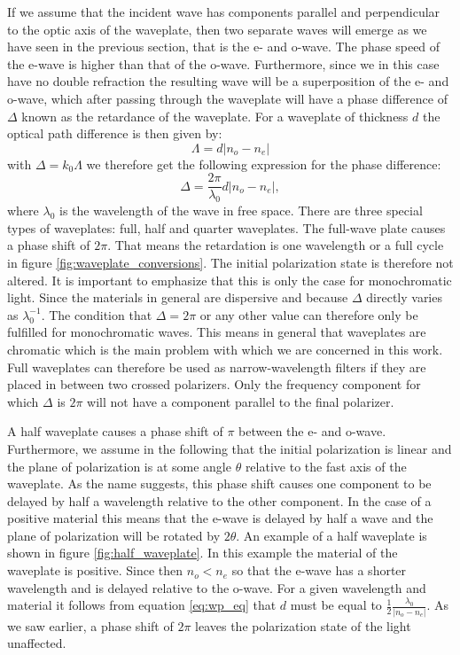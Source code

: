 If we assume that the incident wave has components parallel and perpendicular to the optic axis of the waveplate, then two separate waves will emerge as we have seen in the previous section, that is the e- and o-wave. The phase speed of the e-wave is higher than that of the o-wave. Furthermore, since we in this case have no double refraction the resulting wave will be a superposition of the e- and o-wave, which after passing through the waveplate will have a phase difference of $\Delta$ known as the retardance of the waveplate. For a waveplate of thickness $d$ the optical path difference is then given by:
\begin{equation}
    \Lambda = d|n_o - n_e|
\end{equation}
with $\Delta = k_0 \Lambda$ we therefore get the following expression for the phase difference:
\begin{equation}
    \label{eq:wp_eq}
    \Delta = \frac{2\pi}{\lambda_0}d|n_o - n_e|,
\end{equation}
where $\lambda_0$ is the wavelength of the wave in free space. There are three special types of waveplates: full, half and quarter waveplates. The full-wave plate causes a phase shift of $2\pi$. That means the retardation is one wavelength or a full cycle in figure \ref{fig:waveplate_conversions}. The initial polarization state is therefore not altered. It is important to emphasize that this is only the case for monochromatic light. Since the materials in general are dispersive and because $\Delta$ directly varies as $\lambda_0^{-1}$. The condition that $\Delta = 2\pi$ or any other value can therefore only be fulfilled for monochromatic waves. This means in general that waveplates are chromatic which is the main problem with which we are concerned in this work. Full waveplates can therefore be used as narrow-wavelength filters if they are placed in between two crossed polarizers. Only the frequency component for which $\Delta$ is $2\pi$ will not have a component parallel to the final polarizer. 

A half waveplate causes a phase shift of $\pi$ between the e- and o-wave. Furthermore, we assume in the following that the initial polarization is linear and the plane of polarization is at some angle $\theta$ relative to the fast axis of the waveplate. As the name suggests, this phase shift causes one component to be delayed by half a wavelength relative to the other component. In the case of a positive material this means that the e-wave is delayed by half a wave and the plane of polarization will be rotated by $2\theta$. An example of a half waveplate is shown in figure \ref{fig:half_waveplate}. In this example the material of the waveplate is positive. Since then $n_o<n_e$ so that the e-wave has a shorter wavelength and is delayed relative to the o-wave. For a given wavelength and material it follows from equation \ref{eq:wp_eq} that $d$ must be equal to $\frac{1}{2}\frac{\lambda_0}{|n_o - n_e|}$. As we saw earlier, a phase shift of $2\pi$ leaves the polarization state of the light unaffected. 


